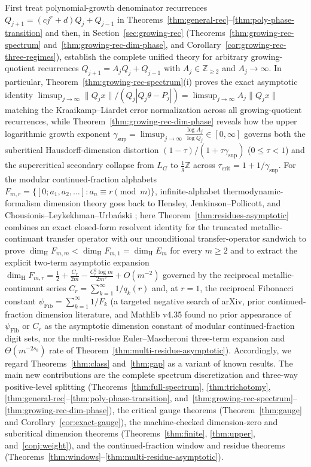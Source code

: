 \documentclass[11pt]{article}
\theoremstyle{definition}
\theoremstyle{remark}
\newcommand{\Z}{\mathbb{Z}}
\newcommand{\dimH}{\dim_{\mathrm{H}}}
\begin{document}
First treat polynomial-growth denominator recurrences
$Q_{j+1}=(cj^r+d)Q_j+Q_{j-1}$ in
Theorems~\ref{thm:general-rec}--\ref{thm:poly-phase-transition} and then, in
Section~\ref{sec:growing-rec} (Theorems~\ref{thm:growing-rec-spectrum}
and~\ref{thm:growing-rec-dim-phase}, and
Corollary~\ref{cor:growing-rec-three-regimes}), establish the complete unified
theory for arbitrary growing-quotient recurrences $Q_{j+1}=A_jQ_j+Q_{j-1}$ with
$A_j\in\Z_{\ge2}$ and $A_j\to\infty$. In particular, Theorem~\ref{thm:growing-rec-spectrum}(i)
proves the exact asymptotic identity
$\limsup_{j\to\infty}\|Q_jx\|/(Q_j|Q_j\theta-P_j|)=\limsup_{j\to\infty}A_j\|Q_jx\|$
matching the Kraaikamp--Liardet error normalization across all growing-quotient
recurrences, while Theorem~\ref{thm:growing-rec-dim-phase} reveals how the upper
logarithmic growth exponent $\gamma_{\sup}=\limsup_{j\to\infty}\frac{\log A_j}{\log Q_j}\in[0,\infty]$
governs both the subcritical Hausdorff-dimension distortion
$(1-\tau)/(1+\tau\gamma_{\sup})$ ($0\le\tau<1$) and the supercritical secondary
collapse from $L_G$ to $\frac{1}{g}\Z$ across $\tau_{\mathrm{crit}}=1+1/\gamma_{\sup}$.
For the modular continued-fraction alphabets $F_{m,r}=\{[0;a_1,a_2,\dots]:a_n\equiv r\pmod m\}$,
infinite-alphabet thermodynamic-formalism dimension theory goes back to Hensley,
Jenkinson--Pollicott, and Chousionis--Leykekhman--Urba\'nski \cite{CLU}; here
Theorem~\ref{thm:residues-asymptotic} combines an exact closed-form resolvent
identity for the truncated metallic-continuant transfer operator with our
unconditional transfer-operator sandwich to prove $\dimH F_{m,m}<\dimH F_{m,1}=\dimH E_m$
for every $m\ge2$ and to extract the explicit two-term asymptotic expansion
$\dimH F_{m,r}=\frac12+\frac{C_r}{2m}-\frac{C_r^2\log m}{2m^2}+O(m^{-2})$ governed
by the reciprocal metallic-continuant series $C_r=\sum_{k=1}^\infty 1/q_k(r)$ and,
at $r=1$, the reciprocal Fibonacci constant $\psi_{\mathrm{Fib}}=\sum_{k=1}^\infty 1/F_k$
(a targeted negative search of arXiv, prior continued-fraction dimension
literature, and Mathlib v4.35 found no prior appearance of $\psi_{\mathrm{Fib}}$ or $C_r$ as the
asymptotic dimension constant of modular continued-fraction digit sets, nor
the multi-residue Euler--Mascheroni three-term expansion and $\Theta(m^{-2s_0})$
rate of Theorem~\ref{thm:multi-residue-asymptotic}).
Accordingly, we
regard Theorems~\ref{thm:class} and~\ref{thm:gap} as a variant of known results.
The main new contributions are the complete spectrum discretization and
three-way positive-level splitting (Theorems~\ref{thm:full-spectrum},
\ref{thm:trichotomy}, \ref{thm:general-rec}--\ref{thm:poly-phase-transition},
and~\ref{thm:growing-rec-spectrum}--\ref{thm:growing-rec-dim-phase}), the critical gauge theorems
(Theorem~\ref{thm:gauge} and Corollary~\ref{cor:exact-gauge}), the machine-checked
dimension-zero and subcritical dimension theorems (Theorems~\ref{thm:finite},
\ref{thm:upper}, and~\ref{conj:weight}), and the continued-fraction window and
residue theorems (Theorems~\ref{thm:windows}--\ref{thm:multi-residue-asymptotic}).
\end{document}
